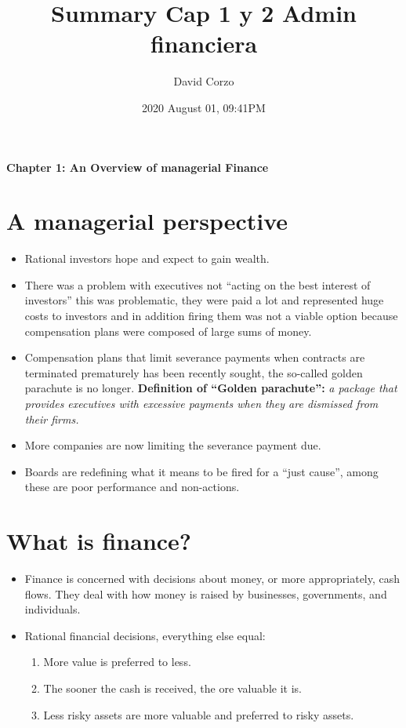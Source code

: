 \documentclass{article}
\title{Summary Cap 1 y 2 Admin financiera}
\date{2020 August 01, 09:41PM}
\author{David Corzo}
\renewcommand{\termdefinition}[2]{
    \textbf{Definition of ``#1'':} \emph{#2}
}
\begin{document}
\maketitle

{
    \LARGE\noindent \textbf{Chapter 1: An Overview of managerial Finance}
}
\section{A managerial perspective}
\begin{itemize}
    \item Rational investors hope and expect to gain wealth. 
    \item There was a problem with executives not ``acting on the best interest of investors'' this was problematic, they were paid a lot and represented huge costs to investors and in addition firing them was not a viable option because compensation plans were composed of large sums of money. 
    \item Compensation plans that limit severance payments when contracts are terminated prematurely has been recently sought, the so-called golden parachute is no longer. \termdefinition{Golden parachute}{ a package that provides executives with excessive payments when they are dismissed from their firms.} 
    \item More companies are now limiting the severance payment due. 
    \item Boards are redefining what it means to be fired for a ``just cause'', among these are poor performance and non-actions.
\end{itemize}

\section{What is finance?}
\begin{itemize}
    \item Finance is concerned with decisions about money, or more appropriately, cash flows. They deal with how money is raised by businesses, governments, and individuals. 
    \item Rational financial decisions, everything else equal:
        \begin{enumerate}
            \item More value is preferred to less. 
            \item The sooner the cash is received, the ore valuable it is. 
            \item Less risky assets are more valuable and preferred to risky assets. 
        \end{enumerate}
\end{itemize}
\end{document}
